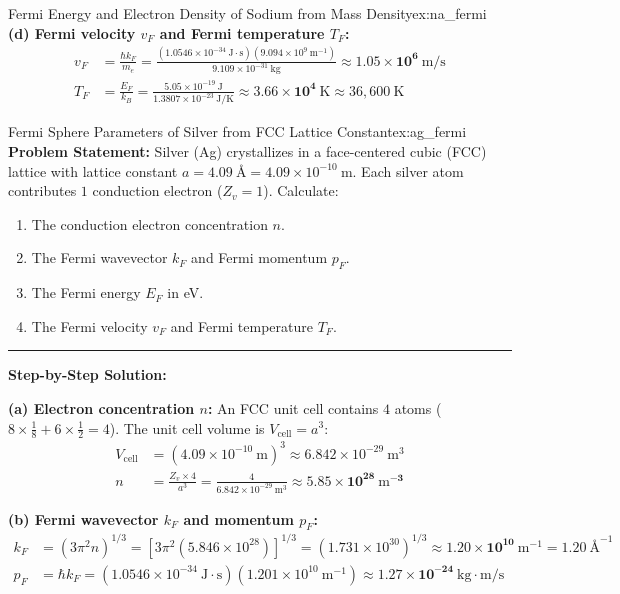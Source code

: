 \documentclass[11pt,a4paper]{article}
\begin{document}
\begin{examplebox}{Fermi Energy and Electron Density of Sodium from Mass Density}{ex:na_fermi}
\textbf{(d) Fermi velocity $v_F$ and Fermi temperature $T_F$:}
\begin{align*}
v_F &= \frac{\hbar k_F}{m_e} = \frac{(1.0546 \times 10^{-34}\ \mathrm{J\cdot s})(9.094 \times 10^9\ \mathrm{m^{-1}})}{9.109 \times 10^{-31}\ \mathrm{kg}} \approx \mathbf{1.05 \times 10^6\ \mathrm{m/s}} \\
T_F &= \frac{E_F}{k_B} = \frac{5.05 \times 10^{-19}\ \mathrm{J}}{1.3807 \times 10^{-23}\ \mathrm{J/K}} \approx \mathbf{3.66 \times 10^4\ \mathrm{K}} \approx 36{,}600\ \mathrm{K}
\end{align*}
\end{examplebox}

\vspace{0.4cm}

\begin{examplebox}{Fermi Sphere Parameters of Silver from FCC Lattice Constant}{ex:ag_fermi}
\textbf{Problem Statement:}
Silver (Ag) crystallizes in a face-centered cubic (FCC) lattice with lattice constant $a = 4.09\ \text{\AA} = 4.09 \times 10^{-10}\ \mathrm{m}$. Each silver atom contributes $1$ conduction electron ($Z_v = 1$). Calculate:
\begin{enumerate}[label=(\alph*)]
    \item The conduction electron concentration $n$.
    \item The Fermi wavevector $k_F$ and Fermi momentum $p_F$.
    \item The Fermi energy $E_F$ in eV.
    \item The Fermi velocity $v_F$ and Fermi temperature $T_F$.
\end{enumerate}

\vspace{0.2cm}\hrule\vspace{0.2cm}
\textbf{Step-by-Step Solution:}

\textbf{(a) Electron concentration $n$:}
An FCC unit cell contains $4$ atoms ($8 \times \frac{1}{8} + 6 \times \frac{1}{2} = 4$). The unit cell volume is $V_{\mathrm{cell}} = a^3$:
\begin{align*}
V_{\mathrm{cell}} &= (4.09 \times 10^{-10}\ \mathrm{m})^3 \approx 6.842 \times 10^{-29}\ \mathrm{m}^3 \\
n &= \frac{Z_v \times 4}{a^3} = \frac{4}{6.842 \times 10^{-29}\ \mathrm{m}^3} \approx \mathbf{5.85 \times 10^{28}\ \mathrm{m}^{-3}}
\end{align*}

\textbf{(b) Fermi wavevector $k_F$ and momentum $p_F$:}
\begin{align*}
k_F &= (3\pi^2 n)^{1/3} = [3\pi^2 (5.846 \times 10^{28})]^{1/3} = (1.731 \times 10^{30})^{1/3} \approx \mathbf{1.20 \times 10^{10}\ \mathrm{m^{-1}}} = 1.20\ \text{\AA}^{-1} \\
p_F &= \hbar k_F = (1.0546 \times 10^{-34}\ \mathrm{J\cdot s})(1.201 \times 10^{10}\ \mathrm{m^{-1}}) \approx \mathbf{1.27 \times 10^{-24}\ \mathrm{kg\cdot m/s}}
\end{align*}


\end{examplebox}
\end{document}
